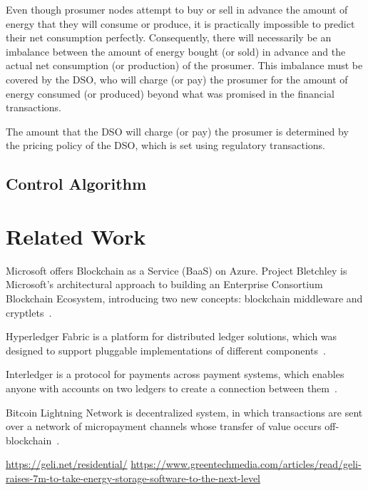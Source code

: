 \documentclass[chi_draft]{sigchi}
\begin{document}
Even though prosumer nodes attempt to buy or sell in advance the amount of energy that they will consume or produce, it is practically impossible to predict their net consumption perfectly.
Consequently, there will necessarily be an imbalance between the amount of energy bought (or sold) in advance and the actual net consumption (or production) of the prosumer.
This imbalance must be covered by the DSO, who will charge (or pay) the prosumer for the amount of energy consumed (or produced) beyond what was promised in the financial transactions.

The amount that the DSO will charge (or pay) the prosumer is determined by the pricing policy of the DSO, which is set using regulatory transactions.


\subsection{Control Algorithm}




\section{Related Work}

Microsoft offers Blockchain as a Service (BaaS) on Azure.
Project Bletchley is Microsoft's architectural approach to building an Enterprise Consortium Blockchain Ecosystem, introducing two new concepts: blockchain middleware and cryptlets~\cite{gray2016introducing}.

Hyperledger Fabric is a platform for distributed ledger solutions, which was designed to support pluggable implementations of different components~\cite{hyperledger2017fabric}.

Interledger is a protocol for payments across payment systems, which enables anyone with accounts on two ledgers to create
a connection between them~\cite{thomas_protocol}.

Bitcoin Lightning Network is decentralized system, in which transactions are sent over a network of micropayment channels whose transfer of value occurs off-blockchain~\cite{poon2016bitcoin}.

\url{https://geli.net/residential/}
\url{https://www.greentechmedia.com/articles/read/geli-raises-7m-to-take-energy-storage-software-to-the-next-level}

\balance{}



\end{document}
